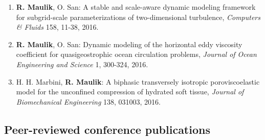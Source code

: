 \documentclass[letterpaper]{article}
\begin{document}
\begin{enumerate}
\item \textbf{R. Maulik}, O. San: A stable and scale-aware dynamic modeling framework for subgrid-scale parameterizations of two-dimensional turbulence, {\it Computers \& Fluids} 158, 11-38, 2016. 

\item \textbf{R. Maulik}, O. San: Dynamic modeling of the horizontal eddy viscosity coefficient for quasigeostrophic ocean circulation problems, {\it Journal of Ocean Engineering and Science} 1, 300-324, 2016.

\item H. H. Marbini, \textbf{R. Maulik}: A biphasic transversely isotropic poroviscoelastic model for the unconfined compression of hydrated soft tissue, {\it Journal of Biomechanical Engineering} 138, 031003, 2016.

\end{enumerate}

\subsection*{Peer-reviewed conference publications}
\end{document}
